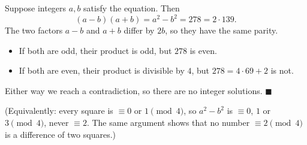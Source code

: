 Suppose integers $a,b$ satisfy the equation. Then
\[(a-b)(a+b)=a^2-b^2=278=2\cdot139.\]
The two factors $a-b$ and $a+b$ differ by $2b$, so they have the same parity.
\begin{itemize}
\item If both are odd, their product is odd, but $278$ is even.
\item If both are even, their product is divisible by $4$, but $278=4\cdot69+2$ is not.
\end{itemize}
Either way we reach a contradiction, so there are no integer solutions. $\blacksquare$

(Equivalently: every square is $\equiv0$ or $1\pmod4$, so $a^2-b^2$ is $\equiv0$, $1$ or $3\pmod 4$, never $\equiv2$. The same argument shows that no number $\equiv2\pmod4$ is a difference of two squares.)
